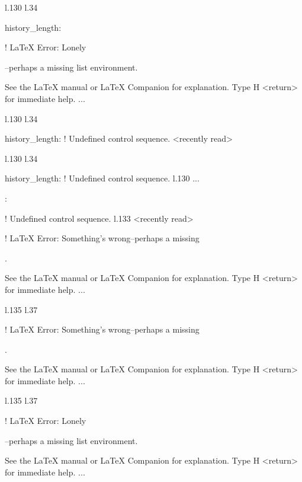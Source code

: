 {{{{{{{{{{{{l.130 l.34     \item \xmlNode
                             {history\_length}: \xmlDesc

! LaTeX Error: Lonely \item--perhaps a missing list environment.

See the LaTeX manual or LaTeX Companion for explanation.
Type  H <return>  for immediate help.
 ...                                              
                                                  
l.130 l.34     \item \xmlNode
                             {history\_length}: \xmlDesc
! Undefined control sequence.
<recently read> \xmlNode 
                         
l.130 l.34     \item \xmlNode
                             {history\_length}: \xmlDesc
! Undefined control sequence.
l.130 ...\item {}: \xmlDesc
                                                  
! Undefined control sequence.
l.133 <recently read> \xmlNode
                              

! LaTeX Error: Something's wrong--perhaps a missing \item.

See the LaTeX manual or LaTeX Companion for explanation.
Type  H <return>  for immediate help.
 ...                                              
                                                  
l.135 l.37     \item \xmlNode
                             

! LaTeX Error: Something's wrong--perhaps a missing \item.

See the LaTeX manual or LaTeX Companion for explanation.
Type  H <return>  for immediate help.
 ...                                              
                                                  
l.135 l.37     \item \xmlNode
                             

! LaTeX Error: Lonely \item--perhaps a missing list environment.

See the LaTeX manual or LaTeX Companion for explanation.
Type  H <return>  for immediate help.
 ...                                              
                                                  
}}}}}}}}}}}}

